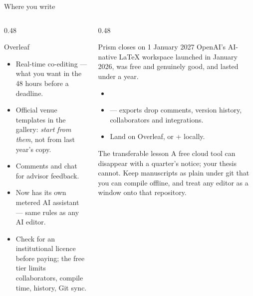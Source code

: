 \documentclass[aspectratio=169,11pt]{beamer}
\begin{document}
\begin{frame}{Where you write}
\begin{columns}[T]
\begin{column}{0.48\textwidth}
\begin{block}{Overleaf \quad\footnotesize{}}
\footnotesize
\begin{itemize}
  \item Real-time co-editing --- what you want in the 48 hours before a
        deadline.
  \item Official venue templates in the gallery: \emph{start from them}, not
        from last year's copy.
  \item Comments and chat for advisor feedback.
  \item Now has its own metered AI assistant --- same rules as any AI editor.
  \item Check for an institutional licence before paying; the free tier limits
        collaborators, compile time, history, Git sync.
\end{itemize}
\end{block}
\end{column}
\begin{column}{0.48\textwidth}
\begin{alertblock}{Prism closes on 1 January 2027}
\footnotesize
OpenAI's AI-native LaTeX workspace launched in January 2026, was free and
genuinely good, and lasted under a year.
\begin{itemize}
  \item {}
  \item {} --- exports drop comments, version
        history, collaborators and integrations.
  \item Land on Overleaf, or  +  locally.
\end{itemize}
\end{alertblock}
\begin{block}{The transferable lesson}
\footnotesize
A free cloud tool can disappear with a quarter's notice; your thesis cannot.
Keep manuscripts as plain  under git that you can compile offline,
and treat any editor as a window onto that repository.
\end{block}
\end{column}
\end{columns}
\end{frame}
\end{document}
